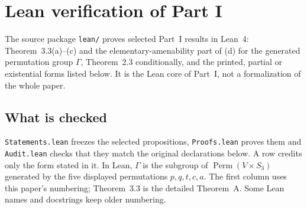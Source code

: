 \clearpage
\section{Lean verification of Part I}\label{app:lean}
The source package \nolinkurl{lean/} proves selected Part~I results in Lean~4:
Theorem~3.3(a)--(c) and the elementary-amenability part of (d) for the
generated permutation group $\Gamma$, Theorem~2.3 conditionally, and the
printed, partial or existential forms listed below. It is the Lean core of
Part~I, not a formalization of the whole paper.

\subsection*{What is checked}
\nolinkurl{Statements.lean} freezes the selected propositions,
\nolinkurl{Proofs.lean} proves them and \nolinkurl{Audit.lean} checks that
they match the original declarations below. A row credits only the form
stated in it. In Lean, $\Gamma$ is the subgroup of
$\operatorname{Perm}(V\times S_3)$ generated by the five displayed
permutations $p,q,t,c,a$. The first column uses this paper's numbering;
Theorem~3.3 is the detailed Theorem~A. Some Lean names and docstrings keep
older numbering.

